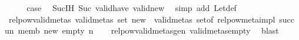 \begin{isabellebody}
\ \ \isamarkupfalse%
\ \isamarkupfalse%
\ {\isacharquery}{\kern0pt}case\ \isamarkupfalse%
\ Suc{\isachardot}{\kern0pt}IH\ Suc\ valid{\isacharunderscore}{\kern0pt}have{\isacharprime}{\kern0pt}\ valid{\isacharunderscore}{\kern0pt}new{\isacharprime}{\kern0pt}\ \isamarkupfalse%
\ {\isacharparenleft}{\kern0pt}simp\ add{\isacharcolon}{\kern0pt}\ Let{\isacharunderscore}{\kern0pt}def{\isacharparenright}{\kern0pt}\isanewline
{}\isamarkupfalse%
%
\endisatagproof
{\isafoldproof}%
%
\isadelimproof
\isanewline
%
\endisadelimproof
\isanewline
{}\isamarkupfalse%
\ relpow{\isacharunderscore}{\kern0pt}valid{\isacharunderscore}{\kern0pt}metas{\isacharcolon}{\kern0pt}\ {\isachardoublequoteopen}valid{\isacharunderscore}{\kern0pt}metas\ {\isacharparenleft}{\kern0pt}set\ new{\isacharparenright}{\kern0pt}\ {\isasymLongrightarrow}\ valid{\isacharunderscore}{\kern0pt}metas\ {\isacharparenleft}{\kern0pt}set{\isacharunderscore}{\kern0pt}of\ {\isacharparenleft}{\kern0pt}relpow{\isacharunderscore}{\kern0pt}meta{\isacharunderscore}{\kern0pt}impl\ succ\ un\ memb\ new\ empty\ n{\isacharparenright}{\kern0pt}{\isacharparenright}{\kern0pt}{\isachardoublequoteclose}\isanewline
%
\isadelimproof
\ \ %
\endisadelimproof
%
\isatagproof
{}\isamarkupfalse%
\ relpow{\isacharunderscore}{\kern0pt}valid{\isacharunderscore}{\kern0pt}metas{\isacharunderscore}{\kern0pt}gen\ valid{\isacharunderscore}{\kern0pt}metas{\isacharunderscore}{\kern0pt}empty\ \isamarkupfalse%
\ blast%
\endisatagproof
{\isafoldproof}%
%
\isadelimproof
\isanewline
%
\endisadelimproof
\isanewline
{}\isamarkupfalse%
\isanewline
%
\isadelimtheory
\isanewline
%
\endisadelimtheory
%
\isatagtheory
{}\isamarkupfalse%
%
\endisatagtheory
{\isafoldtheory}%
%
\isadelimtheory
%
\endisadelimtheory
%
\end{isabellebody}%
\endinput
